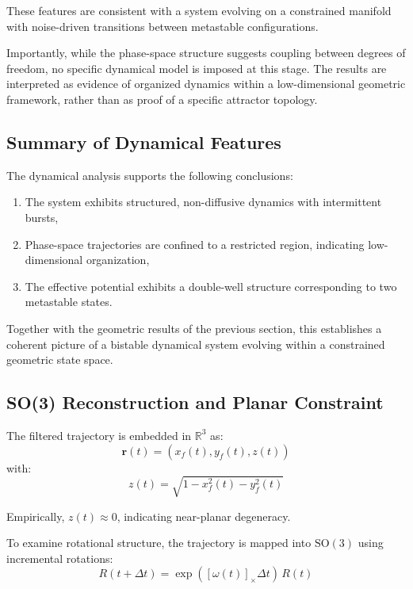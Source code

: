 \documentclass[twocolumn,9pt]{revtex4-2}
\begin{document}
These features are consistent with a system evolving on a constrained manifold with noise-driven transitions between metastable configurations.

Importantly, while the phase-space structure suggests coupling between degrees of freedom, no specific dynamical model is imposed at this stage. The results are interpreted as evidence of organized dynamics within a low-dimensional geometric framework, rather than as proof of a specific attractor topology.

\subsection{Summary of Dynamical Features}
\label{subsec:summary_of_dynamical_features}

The dynamical analysis supports the following conclusions:

\begin{enumerate}
    \item The system exhibits structured, non-diffusive dynamics with intermittent bursts,
    \item Phase-space trajectories are confined to a restricted region, indicating low-dimensional organization,
    \item The effective potential exhibits a double-well structure corresponding to two metastable states.
\end{enumerate}

Together with the geometric results of the previous section, this establishes a coherent picture of a bistable dynamical system evolving within a constrained geometric state space.

\subsection{SO(3) Reconstruction and Planar Constraint}
\label{subsec:so_3_reconstruction_and_planar_constraint}

The filtered trajectory is embedded in $\mathbb{R}^3$ as:
\begin{equation}
\mathbf{r}(t) = (x_f(t), y_f(t), z(t))
\end{equation}
with:
\begin{equation}
z(t) = \sqrt{1 - x_f^2(t) - y_f^2(t)}
\end{equation}

Empirically, $z(t) \approx 0$, indicating near-planar degeneracy.

To examine rotational structure, the trajectory is mapped into $\mathrm{SO}(3)$ using incremental rotations:
\begin{equation}
R(t + \Delta t) = \exp([\omega(t)]_\times \Delta t)\, R(t)
\end{equation}
\end{document}
